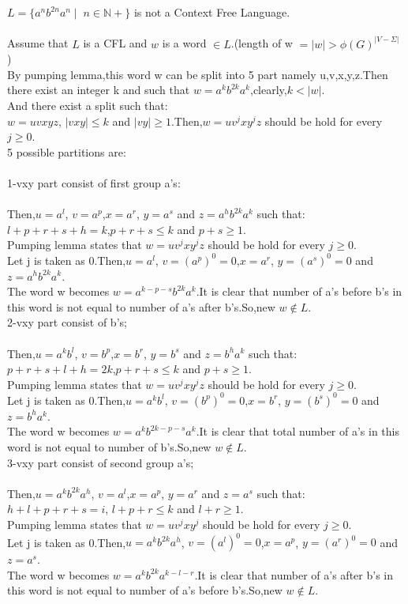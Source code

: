 \documentclass[a4paper,12pt]{article}
\begin{document}
\begin{tcolorbox}

$L=\{a^n b^{2n} a^n \mid \; n \in \mathbb{N+} \}$ is not a Context Free Language.\\\\
Assume that $L$ is a CFL and $w$ is a word $\in L$.(length of w $=|w|>\phi(G)^{|V-\Sigma|}$ )\\By pumping lemma,this word w can be split into 5 part namely u,v,x,y,z.Then there exist an integer k and  such that
$w=a^kb^{2k}a^k$,clearly,$k<|w|$.\\And there exist a split such that:\\
$w=uvxyz$, $|vxy|\leq k$ and $|vy|\geq 1$.Then,$w=uv^jxy^jz$ should be hold for every $j\geq 0$.\\5 possible partitions are:\\\\
1-vxy part consist of first group a's:\\\\
Then,$u=a^l$, $v=a^p$,$x=a^r$, $y=a^s$ and $z=a^hb^{2k}a^k$ such that:\\
$l+p+r+s+h=k$,$p+r+s\leq k$ and $p+s\geq 1$.\\
Pumping lemma states that $w=uv^jxy^jz$ should be hold for every $j\geq 0$.\\
Let j is taken as 0.Then,$u=a^l$, $v={(a^p)}^0=0$,$x=a^r$, $y={(a^s)}^0=0$ and $z=a^hb^{2k}a^k$.\\The word w becomes $w=a^{k-p-s}b^{2k}a^k$.It is clear that number of a's before b's in this word is not equal to number of a's after b's.So,new $w \notin L$.\\  

2-vxy part consist of b's;\\\\
Then,$u=a^kb^l$, $v=b^p$,$x=b^r$, $y=b^s$ and $z=b^ha^k$ such that:\\
$p+r+s+l+h=2k$,$p+r+s\leq k$ and $p+s\geq 1$.\\
Pumping lemma states that $w=uv^jxy^jz$ should be hold for every $j\geq 0$.\\
Let j is taken as 0.Then,$u=a^kb^l$, $v={(b^p)}^0=0$,$x=b^r$, $y={(b^s)}^0=0$ and $z=b^ha^k$.\\The word w becomes $w=a^kb^{2k-p-s}a^k$.It is clear that total number of a's in this word is not equal to number of b's.So,new $w \notin L$.\\

3-vxy part consist of second group a's;\\\\
Then,$u=a^kb^{2k}a^h$, $v=a^l$,$x=a^p$, $y=a^r$ and $z=a^s$ such that:\\
$h+l+p+r+s=i$, $l+p+r\leq k$ and $l+r\geq 1$.\\
Pumping lemma states that $w=uv^jxy^j$ should be hold for every $j\geq 0$.\\
Let j is taken as 0.Then,$u=a^kb^{2k}a^h$, $v={(a^l)}^0=0$,$x=a^p$, $y={(a^r)}^0=0$ and $z=a^s$.\\The word w becomes $w=a^kb^{2k}a^{k-l-r}$.It is clear that number of a's after b's in this word is not equal to number of a's before b's.So,new $w \notin L$.\\


\end{tcolorbox}
\end{document}
